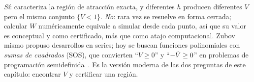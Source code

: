 \begin{profundiza}
\emph{Sí}: caracteriza la región de atracción exacta, y diferentes $h$ producen diferentes $V$ pero el mismo conjunto $\{V<1\}$. \emph{No}: rara vez se resuelve en forma cerrada; calcular $W$ numéricamente equivale a simular desde cada punto, así que su valor es conceptual y como certificado, más que como atajo computacional. Zubov mismo propuso desarrollos en series; hoy se buscan funciones polinomiales con \emph{sumas de cuadrados} (SOS), que convierten ``$V\ge0$'' y ``$-\dot V\ge0$'' en problemas de programación semidefinida~\citep{Par00}. Es la versión moderna de las dos preguntas de este capítulo: encontrar $V$ y certificar una región.
\end{profundiza}
